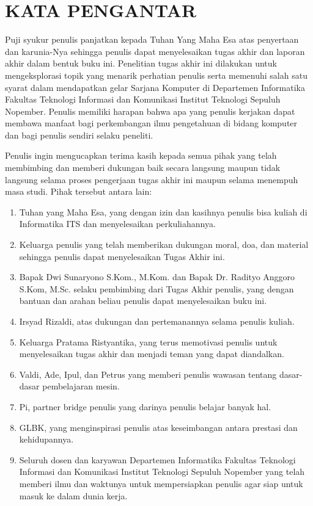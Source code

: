 \chapter {KATA PENGANTAR}

Puji syukur penulis panjatkan kepada Tuhan Yang Maha Esa atas penyertaan dan karunia-Nya sehingga penulis dapat menyelesaikan tugas akhir dan laporan akhir dalam bentuk buku ini. Penelitian tugas akhir ini dilakukan untuk mengeksplorasi topik yang menarik perhatian penulis serta memenuhi salah satu syarat dalam mendapatkan gelar Sarjana Komputer di Departemen Informatika Fakultas Teknologi Informasi dan Komunikasi Institut Teknologi Sepuluh Nopember. Penulis memiliki harapan bahwa apa yang penulis kerjakan dapat membawa manfaat bagi perkembangan ilmu pengetahuan di bidang komputer dan bagi penulis sendiri selaku peneliti.

Penulis ingin mengucapkan terima kasih kepada semua pihak yang telah membimbing dan memberi dukungan baik secara langsung maupun tidak langsung selama proses pengerjaan tugas akhir ini maupun selama menempuh masa studi. Pihak tersebut antara lain:

\begin {enumerate}
	\item Tuhan yang Maha Esa, yang dengan izin dan kasihnya penulis bisa kuliah di Informatika ITS dan menyelesaikan perkuliahannya.
	\item Keluarga penulis yang telah memberikan dukungan moral, doa, dan material sehingga penulis dapat menyelesaikan Tugas Akhir ini.
	\item Bapak Dwi Sunaryono S.Kom., M.Kom. dan Bapak Dr. Radityo Anggoro S.Kom, M.Sc.  selaku pembimbing dari Tugas Akhir penulis, yang dengan bantuan dan arahan beliau penulis dapat menyelesaikan buku ini.
	\item Irsyad Rizaldi, atas dukungan dan pertemanannya selama penulis kuliah.
	\item Keluarga Pratama Ristyantika, yang terus memotivasi penulis untuk menyelesaikan tugas akhir dan menjadi teman yang dapat diandalkan.
	\item Valdi, Ade, Ipul, dan Petrus yang memberi penulis wawasan tentang dasar-dasar pembelajaran mesin.
	\item Pi, partner bridge penulis yang darinya penulis belajar banyak hal.
	\item GLBK, yang menginspirasi penulis atas keseimbangan antara prestasi dan kehidupannya.
	\item Seluruh dosen dan karyawan Departemen Informatika Fakultas Teknologi Informasi dan Komunikasi Institut Teknologi Sepuluh Nopember yang telah memberi ilmu dan waktunya untuk mempersiapkan penulis agar siap untuk masuk ke dalam dunia kerja. 
\end {enumerate}

